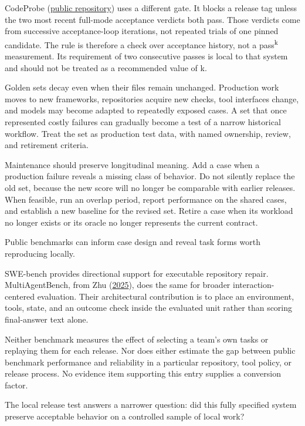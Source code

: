 CodeProbe (\href{https://github.com/sjarmak/codeprobe}{public repository}) uses a different gate. It blocks a release tag unless the two most recent full-mode acceptance verdicts both pass. Those verdicts come from successive acceptance-loop iterations, not repeated trials of one pinned candidate. The rule is therefore a check over acceptance history, not a pass\textsuperscript{k} measurement. Its requirement of two consecutive passes is local to that system and should not be treated as a recommended value of k.

Golden sets decay even when their files remain unchanged. Production work moves to new frameworks, repositories acquire new checks, tool interfaces change, and models may become adapted to repeatedly exposed cases. A set that once represented costly failures can gradually become a test of a narrow historical workflow. Treat the set as production test data, with named ownership, review, and retirement criteria.

Maintenance should preserve longitudinal meaning. Add a case when a production failure reveals a missing class of behavior. Do not silently replace the old set, because the new score will no longer be comparable with earlier releases. When feasible, run an overlap period, report performance on the shared cases, and establish a new baseline for the revised set. Retire a case when its workload no longer exists or its oracle no longer represents the current contract.

Public benchmarks can inform case design and reveal task forms worth reproducing locally.

SWE-bench provides directional support for executable repository repair. MultiAgentBench, from Zhu (\href{https://arxiv.org/abs/2503.01935}{2025}), does the same for broader interaction-centered evaluation. Their architectural contribution is to place an environment, tools, state, and an outcome check inside the evaluated unit rather than scoring final-answer text alone.

Neither benchmark measures the effect of selecting a team's own tasks or replaying them for each release. Nor does either estimate the gap between public benchmark performance and reliability in a particular repository, tool policy, or release process. No evidence item supporting this entry supplies a conversion factor.

The local release test answers a narrower question: did this fully specified system preserve acceptable behavior on a controlled sample of local work?

